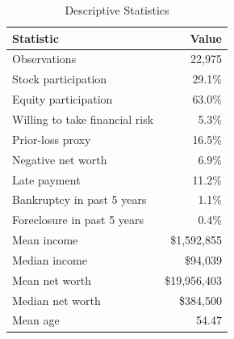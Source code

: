\begin{table}[!h]
\centering
\caption{Descriptive Statistics}
\centering
\fontsize{10}{12}\selectfont
\begin{tabular}[t]{lr}
\toprule
Statistic & Value\\
\midrule
Observations & 22,975\\
Stock participation & 29.1\%\\
Equity participation & 63.0\%\\
Willing to take financial risk & 5.3\%\\
Prior-loss proxy & 16.5\%\\
\addlinespace
Negative net worth & 6.9\%\\
Late payment & 11.2\%\\
Bankruptcy in past 5 years & 1.1\%\\
Foreclosure in past 5 years & 0.4\%\\
Mean income & \$1,592,855\\
\addlinespace
Median income & \$94,039\\
Mean net worth & \$19,956,403\\
Median net worth & \$384,500\\
Mean age & 54.47\\
\bottomrule
\end{tabular}
\end{table}
